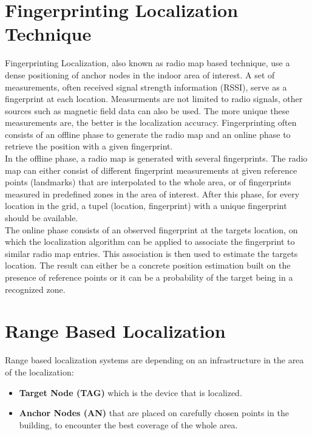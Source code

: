 \section{Fingerprinting Localization Technique}
Fingerprinting Localization, also known as radio map based technique, use a dense positioning of anchor nodes in the indoor area of interest. A set of measurements, often received signal strength information (RSSI), serve as a fingerprint at each location. Measurments are not limited to radio signals, other sources such as magnetic field data can also be used. The more unique these measurements are, the better is the localization accuracy. Fingerprinting often consists of an offline phase to generate the radio map and an online phase to retrieve the position with a given fingerprint.\\
\noindent\hspace*{5mm}%
In the offline phase, a radio map is generated with several fingerprints. The radio map can either consist of different fingerprint measurements at given reference points (landmarks) that are interpolated to the whole area, or of fingerprints measured in predefined zones in the area of interest. After this phase, for every location in the grid, a tupel (location, fingerprint) with a unique fingerprint should be available.\\
\noindent\hspace*{5mm}%
The online phase consists of an observed fingerprint at the targets location, on which the localization algorithm can be applied to associate the fingerprint to similar radio map entries. This association is then used to estimate the targets location. The result can either be a concrete position estimation built on the presence of reference points or it can be a probability of the target being in a recognized zone. 


\section{Range Based Localization}

Range based localization systems are depending on an infrastructure in the area of the localization:
\begin{itemize} 
\item \textbf{Target Node (TAG)} which is the device that is localized. 
\item \textbf{Anchor Nodes (AN)} that are placed on carefully chosen points in the building, to encounter the best coverage of the whole area.
\end{itemize}

